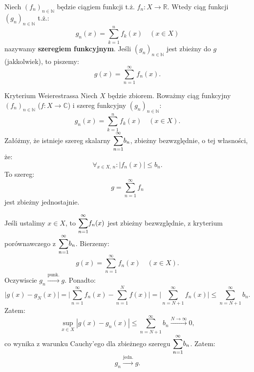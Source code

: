 \documentclass{article}
\numberwithin{defi}{section}
\numberwithin{defi}{section}
\newcommand{\R}{\mathbb{R}}
\newcommand{\N}{\mathbb{N}}
\newcommand{\C}{\mathbb{C}}
\newcommand{\oo}{\infty}
\renewcommand{\leq}{\leqslant}
\newcommand{\tb}[1]{\textbf{#1}}
\newcommand{\bsum}[2]{\mathlarger{\sum_{#1}^{#2}}}
\newcommand{\szerI}[1]{\bsum{n=1}{\oo} #1_n}
\newcommand{\ciag}[1]{(#1_{n})_{n \in \N}}
\newcommand{\topunk}{\xrightarrow{\text{punk.}}}
\newcommand{\tojedn}{\xrightarrow{\text{jedn.}}}
\begin{document}
\begin{defr}{}
    Niech $\ciag{f}$ będzie ciągiem funkcji t.ż. $f_n: X \to \R$. Wtedy ciąg funkcji $\ciag{g}$ t.ż.: \begin{equation}
        g_n(x)  = \sum_{k = 1}^{n} f_k(x) \quad (x \in X)
    \end{equation} nazywamy \tb{szeregiem funkcyjnym}. Jeśli $\ciag{g}$ jest zbieżny do $g$ (jakkolwiek), to piszemy: \begin{equation}
        g(x) = \sum_{n = 1}^{\oo} f_n(x).
    \end{equation}
\end{defr}


\begin{twier}[label=twier:kryt-Weierestrassa]{Kryterium Weierestrassa}
    Niech $X$ będzie zbiorem. Roważmy ciąg funkcyjny $\ciag{f}$ ($f: X \to \C$) i szereg funkcyjny $\ciag{g}$: \begin{equation}
        g_n(x)  = \sum_{k = 1}^{n} f_k(x) \quad (x \in X).
    \end{equation} Załóżmy, że istnieje szereg skalarny $\szerI{b}$, zbieżny bezwzględnie, o tej własności, że: \begin{equation}
        \forall_{x \in X, \, n}: | f_n(x) | \leq b_n.
    \end{equation}
    To szereg: \begin{equation}
        g = \sum_{n  = 1}^{\oo} f_n
    \end{equation} jest zbieżny jednostajnie.
\end{twier}

\begin{dow}
    Jeśli ustalimy $x \in X$, to $\bsum{n = 1}{\oo} f_n(x)$ jest zbieżny bezwzględnie, z kryterium porównawczego z $\bsum{n = 1}{\oo} b_n$. Bierzemy: \begin{equation*}
        g(x) = \sum_{n = 1}^{\oo} f_n(x) \quad (x \in X).
    \end{equation*} Oczywiscie $g_n \topunk g$. Ponadto: \begin{equation*}
        \big| g(x) - g_N(x) \big| = \big| \sum_{n = 1}^{\oo} f_n(x) - \sum_{n =1 }^{N} f(x) \big| = \big| \sum_{n = N + 1}^{\oo} f_n(x) \big| \leq \sum_{n = N+1}^{\oo} b_n.
    \end{equation*}
    Zatem: \begin{equation*}
        \sup_{x \in X} |g(x) - g_n(x)| \leq \sum_{n = N+1}^{\oo} b_n \xrightarrow{N \to \oo} 0,
    \end{equation*} co wynika z warunku Cauchy'ego dla zbieżnego szeregu $\bsum{n = 1}{\oo} b_n$. Zatem: \begin{equation*}
        g_n \tojedn g.
    \end{equation*}
\end{dow}
\end{document}

